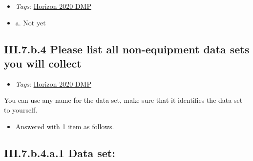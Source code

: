 \documentclass[a4paper,12pt]{report}
\begin{document}
\begin{itemize}
  \item \textit{Tags}: \ul{Horizon 2020 DMP}
  \end{itemize}




\begin{itemize}
  \item[\CheckmarkBold] a. Not yet
\end{itemize}




\subsection*{\protect\textcolor{colorSecId}{III.7.b.4} Please list all non-equipment data sets you will collect}

\label{b1df3c74-0b1f-4574-81c4-4cc2d780c1af.f038bd46-ee4e-4f53-b7ea-482381c2c855.4fd89b13-f33c-4858-8b25-ab6da271efc6.b642c31d-a512-4ca7-8743-a2e0254006fa}


\begin{itemize}
  \item \textit{Tags}: \ul{Horizon 2020 DMP}
  \end{itemize}


\noindent
\begin{markdown}
You can use any name for the data set, make sure that it identifies the data set to yourself.
\end{markdown}


\begin{itemize}
  \item[\ArrowBoldDownRight] Answered with 1 item as follows.
\end{itemize}%
\subsection*{\protect\textcolor{colorSecId}{III.7.b.4.a.1} Data set:}

\label{b1df3c74-0b1f-4574-81c4-4cc2d780c1af.f038bd46-ee4e-4f53-b7ea-482381c2c855.4fd89b13-f33c-4858-8b25-ab6da271efc6.b642c31d-a512-4ca7-8743-a2e0254006fa.539c5087-3111-4e57-92e3-8a00ec1c1b82.d87a239f-9aee-4d6a-a5f6-fa83c73e67e1}
\end{document}
